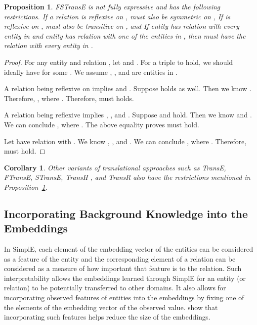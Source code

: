 \documentclass{article}
\newtheorem{proposition}{Proposition}
\newtheorem{corollary}{Corollary}
\begin{document}
\begin{proposition} \label{fstranse-prop}
FSTransE is not fully expressive and has the following restrictions.  If a relation  is reflexive on ,  must also be symmetric on ,  If  is reflexive on ,  must also be transitive on , and  If entity  has relation  with every entity in  and entity  has relation  with one of the entities in , then  must have the relation  with every entity in .
\end{proposition}

\begin{proof}
For any entity  and relation , let  and . For a triple  to hold, we should ideally have  for some . We assume , ,  and  are entities in .

 A relation  being reflexive on  implies  and . Suppose  holds as well. Then we know . Therefore, , where .
Therefore,  must holds.

 A relation  being reflexive implies , , and . Suppose  and  hold. Then we know  and . We can conclude , where . The above equality proves  must hold.

 Let  have relation  with . We know , , and . We can conclude , where . Therefore,  must hold.
\end{proof}

\begin{corollary}
Other variants of translational approaches such as TransE, FTransE, STransE, TransH \cite{wang2014knowledge}, and TransR \cite{lin2015learning} also have the restrictions mentioned in Proposition~\ref{fstranse-prop}.
\end{corollary}

\subsection{Incorporating Background Knowledge into the Embeddings} \label{expert-subsection}
In SimplE, each element of the embedding vector of the entities can be considered as a feature of the entity and the corresponding element of a relation can be considered as a measure of how important that feature is to the relation. Such interpretability allows the embeddings learned through SimplE for an entity (or relation) to be potentially transferred to other domains. It also allows for incorporating observed features of entities into the embeddings by fixing one of the elements of the embedding vector of the observed value. \citet{nickel2014reducing} show that incorporating such features helps reduce the size of the embeddings.
 
\end{document}
